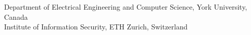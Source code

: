 {
  Department of Electrical Engineering and Computer Science, York University, Canada \\
  Institute of Information Security, ETH Zurich, Switzerland
}

\date[iFM 2013, 12/06/13]
{
  iFM 2013, Turku, Finland\\
  12th June 2013\\
}

\subject{Formal Methods}






\newcommand{\follows}{\Leftarrow}

\makeatletter
\newcommand*\dashV{\mathrel{\mathpalette\m@thr@fl@ct{\mathord\vDash}}}
\newcommand*\m@thr@fl@ct[2]{\reflectbox{$\m@th#1#2$}}
\makeatother
\providecommand{\abstracts}{\textsf{refined by}}
\providecommand{\satisfies}{\textsf{satisfies}}





